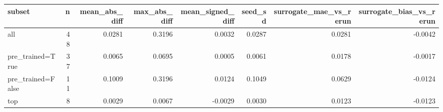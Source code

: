\begin{tabular}{lrrrrrrr}
\toprule
           subset &  n &  mean\_abs\_diff &  max\_abs\_diff &  mean\_signed\_diff &  seed\_sd &  surrogate\_mae\_vs\_rerun &  surrogate\_bias\_vs\_rerun \\
\midrule
              all & 48 &         0.0281 &        0.3196 &            0.0032 &   0.0287 &                  0.0281 &                  -0.0042 \\
 pre\_trained=True & 37 &         0.0065 &        0.0695 &            0.0005 &   0.0061 &                  0.0178 &                  -0.0017 \\
pre\_trained=False & 11 &         0.1009 &        0.3196 &            0.0124 &   0.1049 &                  0.0629 &                  -0.0124 \\
              top &  8 &         0.0029 &        0.0067 &           -0.0029 &   0.0030 &                  0.0123 &                  -0.0123 \\
\bottomrule
\end{tabular}
